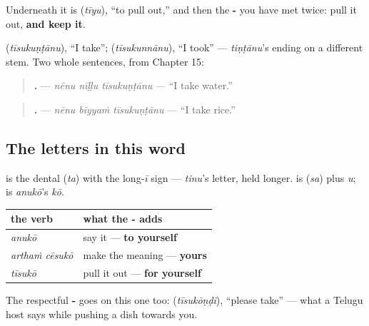 Underneath it is \textbf{} (\emph{tīyu}), \textquotedblleft{}to pull out,\textquotedblright{} and then the \textbf{-} you have met twice: pull it out, \textbf{and keep it}.

\textbf{} (\emph{tīsukuṇṭānu}), \textquotedblleft{}I take\textquotedblright{}; \textbf{} (\emph{tīsukunnānu}), \textquotedblleft{}I took\textquotedblright{} — \emph{tiṇṭānu}'s ending on a different stem. Two whole sentences, from Chapter 15:

\begin{quote}
\textbf{  .} — \emph{nēnu nīḷḷu tīsukuṇṭānu} — \textquotedblleft{}I take water.\textquotedblright{}
\end{quote}

\begin{quote}
\textbf{  .} — \emph{nēnu biyyaṁ tīsukuṇṭānu} — \textquotedblleft{}I take rice.\textquotedblright{}
\end{quote}

\subsection*{The letters in this word}
\textbf{} is the dental \textbf{} (\emph{ta}) with the long-\emph{ī} sign — \emph{tinu}'s letter, held longer. \textbf{} is \textbf{} (\emph{sa}) plus \emph{u}; \textbf{} is \emph{anukō}'s \emph{kō}.

\begin{grammarlens}[title={Grammar Lens: three verbs, one ending}]
\noindent
\begin{tabularx}{\linewidth}{@{}>{\raggedright\arraybackslash}X>{\raggedright\arraybackslash}X@{}}
\toprule
\textbf{the verb} & \textbf{what the -\te{కో} adds} \\
\midrule
\emph{anukō} & say it — \textbf{to yourself} \\
\emph{arthaṁ cēsukō} & make the meaning — \textbf{yours} \\
\emph{tīsukō} & pull it out — \textbf{for yourself} \\
\bottomrule
\end{tabularx}

The respectful \textbf{-} goes on this one too: \textbf{} (\emph{tīsukōṇḍi}), \textquotedblleft{}please take\textquotedblright{} — what a Telugu host says while pushing a dish towards you.
\end{grammarlens}

